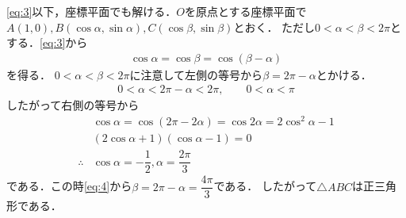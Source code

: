 \documentclass[../../main.tex]{subfiles}
\begin{document}
\cref{eq:3}以下，座標平面でも解ける．$O$を原点とする座標平面で
$A(1,0), B(\cos\alpha,\sin\alpha), C(\cos\beta,\sin\beta)$とおく．
ただし$0<\alpha<\beta<2\pi$とする．\cref{eq:3}から
\begin{align}
  \cos\alpha=\cos\beta=\cos(\beta-\alpha)
\end{align}
を得る．
$0<\alpha<\beta<2\pi$に注意して左側の等号から$\beta=2\pi-\alpha$とかける．
\begin{align}
  0<\alpha<2\pi-\alpha<2\pi,\qquad0<\alpha<\pi \label{eq:4}
\end{align}
したがって右側の等号から
\begin{align}
  & \cos\alpha=\cos(2\pi-2\alpha)=\cos2\alpha=2\cos^2\alpha-1 \\
  & (2\cos\alpha+1)(\cos\alpha-1)=0 \\
  \therefore
  & \cos\alpha = - \dfrac{1}{2}, \alpha = \dfrac{2\pi}{3}
\end{align}
である．この時\cref{eq:4}から$\beta=2\pi-\alpha=\dfrac{4\pi}{3}$である．
したがって$\triangle ABC$は正三角形である．
\end{document}
